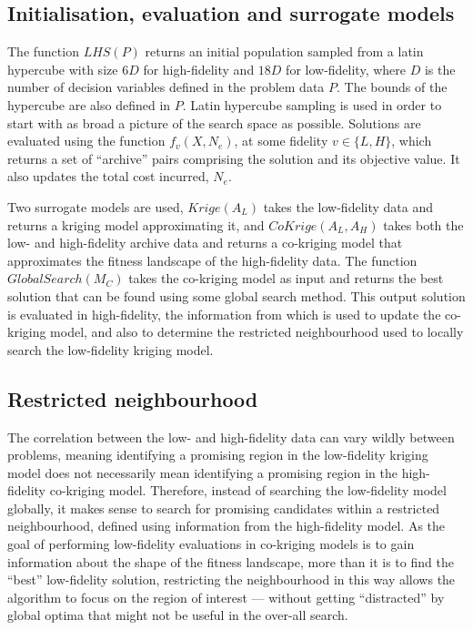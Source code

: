\documentclass[journal]{IEEEtran}
\begin{document}
\subsection{Initialisation, evaluation and surrogate models}
The function $LHS(P)$ returns an initial population sampled from a latin hypercube with size $6D$ for high-fidelity and $18D$ for low-fidelity, where $D$ is the number of decision variables defined in the problem data $P$. The bounds of the hypercube are also defined in $P$. Latin hypercube sampling is used in order to start with as broad a picture of the search space as possible. Solutions are evaluated using the function $f_v(X,N_e)$, at some fidelity $v\in \{L,H\}$, which returns a set of ``archive'' pairs comprising the solution and its objective value. It also updates the total cost incurred, $N_e$. 

Two surrogate models are used, $Krige(A_L)$ takes the low-fidelity data and returns a kriging model approximating it, and $CoKrige(A_L,A_H)$ takes both the low- and high-fidelity archive data and returns a co-kriging model that approximates the fitness landscape of the high-fidelity data. The function $GlobalSearch(M_C)$ takes the co-kriging model as input and returns the best solution that can be found using some global search method. This output solution is evaluated in high-fidelity, the information from which is used to update the co-kriging model, and also to determine the restricted neighbourhood used to locally search the low-fidelity kriging model.

\subsection{Restricted neighbourhood}\label{subsec:restrict}
The correlation between the low- and high-fidelity data can vary wildly between problems, meaning identifying a promising region in the low-fidelity kriging model does not necessarily mean identifying a promising region in the high-fidelity co-kriging model. Therefore, instead of searching the low-fidelity model globally, it makes sense to search for promising candidates within a restricted neighbourhood, defined using information from the high-fidelity model. As the goal of performing low-fidelity evaluations in co-kriging models is to gain information about the shape of the fitness landscape, more than it is to find the ``best'' low-fidelity solution, restricting the neighbourhood in this way allows the algorithm to focus on the region of interest --- without getting ``distracted'' by global optima that might not be useful in the over-all search.
\end{document}
